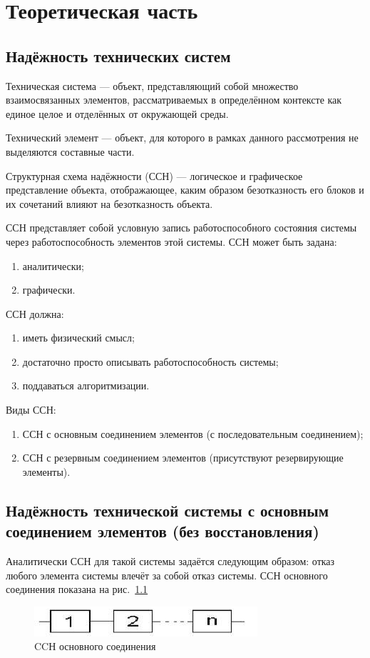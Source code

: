\chapter{Теоретическая часть}
\section{Надёжность технических систем}

	Техническая система --- объект, представляющий собой множество взаимосвязанных элементов, рассматриваемых в определённом контексте как единое целое и отделённых от окружающей среды.
	
	Технический элемент --- объект, для которого в рамках данного рассмотрения не выделяются составные части.
	
	Структурная схема надёжности (ССН) --- логическое и графическое представление объекта, отображающее, каким образом безотказность его блоков и их сочетаний влияют на безотказность объекта. 

	ССН представляет собой условную запись работоспособного состояния системы через работоспособность элементов этой системы. ССН может быть задана:
	\begin{enumerate}
		\item аналитически;
		\item графически. 
	\end{enumerate}
	ССН должна:
	\begin{enumerate}
		\item иметь физический смысл;
		\item достаточно просто описывать работоспособность системы; 
		\item поддаваться алгоритмизации. 
	\end{enumerate}
	Виды ССН: 
	\begin{enumerate}
		\item ССН с основным соединением элементов (с последовательным соединением); 
		\item ССН с резервным соединением элементов (присутствуют резервирующие элементы).
	\end{enumerate}
\section{Надёжность технической системы с основным соединением элементов (без восстановления)}
	Аналитически ССН для такой системы задаётся следующим образом: отказ любого элемента системы влечёт за собой отказ системы. ССН основного соединения показана на рис.~\ref{img:20-0}
	\begin{figure}[h]
	  \centering
	  \includegraphics[width=.5\linewidth]{assets/connect}
	  \caption{CCН основного соединения}
	  \label{img:20-0}
	\end{figure}

